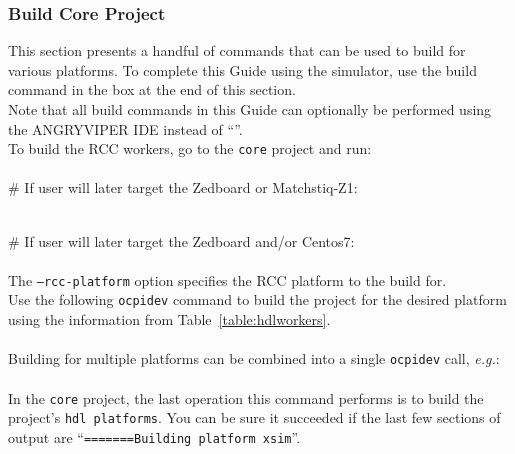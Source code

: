 
\subsubsection{Build Core Project}
This section presents a handful of commands that can be used to build for various platforms. To complete this Guide using the  simulator, use the build command in the box at the end of this section. \\

Note that all build commands in this Guide can optionally be performed using the ANGRYVIPER IDE instead of ``''.\\

To build the RCC workers, go to the \texttt{core} project and run:\\ \\
\# If user will later target the Zedboard or Matchstiq-Z1:\\
\\
\OcpidevBuild

\# If user will later target the Zedboard and/or Centos7:\\
\\

The \texttt{--rcc-platform} option specifies the RCC platform to the build for.\\

Use the following \verb+ocpidev+ command to build the project for the desired platform using the information from Table~\ref{table:hdlworkers}.\\

 \\

Building for multiple platforms can be combined into a single \texttt{ocpidev} call, \textit{e.g.}:\\

 \\

In the \texttt{core} project, the last operation this command performs is to build the project's \texttt{hdl platforms}. You can be sure it succeeded if the last few sections of output are ``\texttt{=======Building platform xsim}''.\\
\begin{center}
\end{center}


